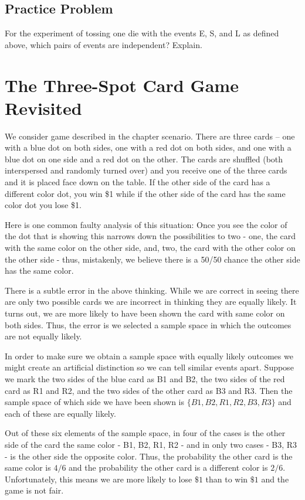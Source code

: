 \documentclass[]{book}
\theoremstyle{definition}
\theoremstyle{definition}
\theoremstyle{definition}
\theoremstyle{remark}
\begin{document}
\subsection{Practice Problem}\label{practice-problem-3}

For the experiment of tossing one die with the events E, S, and L as
defined above, which pairs of events are independent? Explain.

\section{The Three-Spot Card Game
Revisited}\label{three_spot_card_game_revisited}

We consider game described in the chapter scenario. There are three
cards -- one with a blue dot on both sides, one with a red dot on both
sides, and one with a blue dot on one side and a red dot on the other.
The cards are shuffled (both interspersed and randomly turned over) and
you receive one of the three cards and it is placed face down on the
table. If the other side of the card has a different color dot, you win
\$1 while if the other side of the card has the same color dot you lose
\$1.

Here is one common faulty analysis of this situation: Once you see the
color of the dot that is showing this narrows down the possibilities to
two - one, the card with the same color on the other side, and, two, the
card with the other color on the other side - thus, mistakenly, we
believe there is a 50/50 chance the other side has the same color.

There is a subtle error in the above thinking. While we are correct in
seeing there are only two possible cards we are incorrect in thinking
they are equally likely. It turns out, we are more likely to have been
shown the card with same color on both sides. Thus, the error is we
selected a sample space in which the outcomes are not equally likely.

In order to make sure we obtain a sample space with equally likely
outcomes we might create an artificial distinction so we can tell
similar events apart. Suppose we mark the two sides of the blue card as
B1 and B2, the two sides of the red card as R1 and R2, and the two sides
of the other card as B3 and R3. Then the sample space of which side we
have been shown is \(\{B1, B2, R1, R2, B3, R3\}\) and each of these are
equally likely.

Out of these six elements of the sample space, in four of the cases is
the other side of the card the same color - B1, B2, R1, R2 - and in only
two cases - B3, R3 - is the other side the opposite color. Thus, the
probability the other card is the same color is \(4/6\) and the
probability the other card is a different color is \(2/6\).
Unfortunately, this means we are more likely to lose \(\$1\) than to win
\(\$1\) and the game is not fair.
\end{document}
